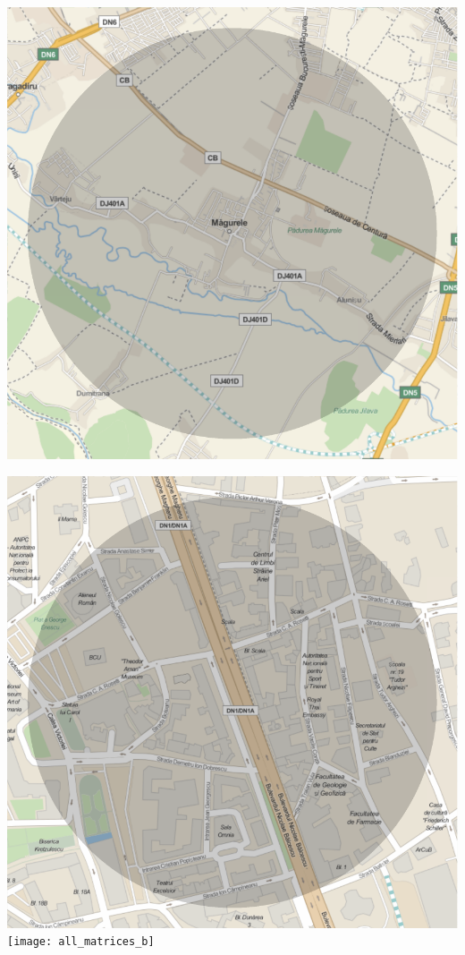 \documentclass[a4,compress]{beamer}
\begin{document}
\begin{frame}
\begin{columns}[c]
\begin{column}{0.6\textwidth}
      \includegraphics[scale=0.22]{all_matrices_m}

      \includegraphics[scale=0.22]{largest_matrix_b}
      \texttt{[image: all\_matrices\_b]}
    \end{column}
  \end{columns}
\end{frame}
\end{document}
